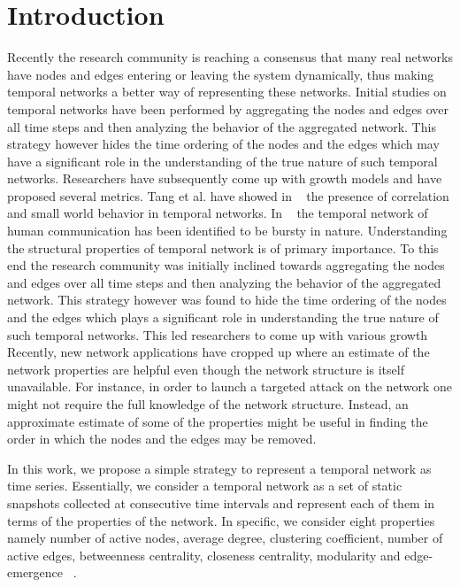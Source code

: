 \noindent
\section{Introduction}
\label{introduction}
Recently the research community is reaching a consensus that many real 
networks have nodes and edges entering or leaving the system dynamically, thus making temporal networks a better way of representing these networks. 
Initial studies on temporal networks have been performed by aggregating the nodes and edges over all time 
steps and then analyzing the behavior of the aggregated network. This strategy however hides the time ordering of the nodes and the edges 
which may have a significant role in the understanding of 
the true nature of such temporal networks.
Researchers have subsequently come up with growth models and have proposed several metrics. Tang et al. have showed in ~\cite{TSMML10:smallworld} 
the presence of correlation and small world 
behavior in temporal networks. In ~\cite{stehle2010dynamical} the temporal network of human communication has been identified to be bursty in nature.
\fi
Understanding the structural properties of temporal network is of primary importance. To this end the research community was initially inclined towards 
aggregating the nodes and edges over all time 
steps and then analyzing the behavior of the aggregated network. This strategy however was found to hide the time ordering of the nodes and the edges 
which plays a significant role in understanding  
the true nature of such temporal networks. This led researchers to come up with various growth 
Recently, new network applications have cropped up where an estimate of the network properties are helpful even though the network structure is itself unavailable. 
For instance, in order to launch a targeted attack on the network one might not require the full knowledge of the network structure. Instead, an approximate estimate of some 
of the properties might be useful in finding the order in which the nodes and the edges may be removed. 

In this work, 
we propose a simple strategy to represent a temporal network as time series. Essentially, we consider a temporal network as a set of static snapshots collected 
at consecutive time intervals and represent each of them in terms of the properties of the network. In specific, we consider eight properties namely number of 
active nodes, average degree, clustering coefficient, number of active edges, betweenness centrality, closeness 
centrality, modularity and edge-emergence ~\cite{sur2014attack}. 

